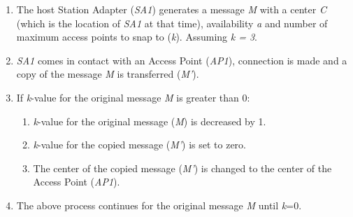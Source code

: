 	\begin{enumerate}
 	 \item The host Station Adapter (\textit{SA1}) generates a message \textit{M} with a center \textit{C} (which is the location of \textit{SA1} at that time), availability \textit{a} and number of maximum access points to snap to (\textit{k}). Assuming \textit{k = 3}.
 	 \item \textit{SA1} comes in contact with an Access Point (\textit{AP1}), connection is made and a copy of the message \textit{M} is transferred (\textit{M'}).
 	 \item If \textit{k}-value for the original message \textit{M} is greater than 0:
 	 	\begin{enumerate}
 	 		\item \textit{k}-value for the original message (\textit{M}) is decreased by 1.
 	 		\item \textit{k}-value for the copied message (\textit{M'}) is set to zero.
 	 		\item The center of the copied message (\textit{M'}) is changed to the center of the Access Point (\textit{AP1}).
 	 	\end{enumerate}
 	 \item The above process continues for the original message \textit{M} until \textit{k}=0.
 	 \end{enumerate}


